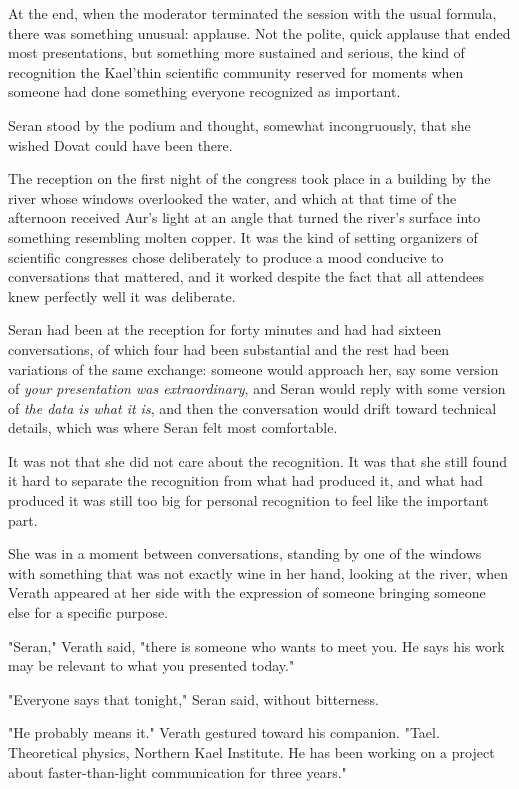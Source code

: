 \documentclass[11pt,a5paper,twoside]{book}
\begin{document}
At the end, when the moderator terminated the session with the usual formula, there was something unusual: applause. Not the polite, quick applause that ended most presentations, but something more sustained and serious, the kind of recognition the Kael'thin scientific community reserved for moments when someone had done something everyone recognized as important.

Seran stood by the podium and thought, somewhat incongruously, that she wished Dovat could have been there.

The reception on the first night of the congress took place in a building by the river whose windows overlooked the water, and which at that time of the afternoon received Aur’s light at an angle that turned the river's surface into something resembling molten copper. It was the kind of setting organizers of scientific congresses chose deliberately to produce a mood conducive to conversations that mattered, and it worked despite the fact that all attendees knew perfectly well it was deliberate.

Seran had been at the reception for forty minutes and had had sixteen conversations, of which four had been substantial and the rest had been variations of the same exchange: someone would approach her, say some version of \textit{your presentation was extraordinary}, and Seran would reply with some version of \textit{the data is what it is}, and then the conversation would drift toward technical details, which was where Seran felt most comfortable.

It was not that she did not care about the recognition. It was that she still found it hard to separate the recognition from what had produced it, and what had produced it was still too big for personal recognition to feel like the important part.

She was in a moment between conversations, standing by one of the windows with something that was not exactly wine in her hand, looking at the river, when Verath appeared at her side with the expression of someone bringing someone else for a specific purpose.

"Seran," Verath said, "there is someone who wants to meet you. He says his work may be relevant to what you presented today."

"Everyone says that tonight," Seran said, without bitterness.

"He probably means it." Verath gestured toward his companion. "Tael. Theoretical physics, Northern Kael Institute. He has been working on a project about faster-than-light communication for three years."
\end{document}
